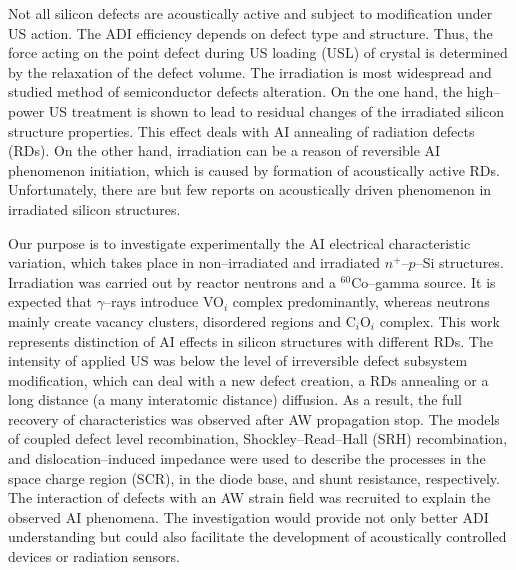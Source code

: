 \documentclass[aip,jap, amsmath,amssymb,reprint]{revtex4-1}
\begin{document}
Not all silicon defects are acoustically active and subject to modification under US action.
The ADI efficiency depends on defect type and structure. \cite{UST:Medvid}
Thus, the force acting on the point defect during US loading (USL) of crystal is determined by the relaxation of the defect volume\cite{MirzadeJAP2011,PeleshchakUJF2016}.
The irradiation is most widespread and studied method of semiconductor defects alteration.
On the one hand, the high--power US treatment is shown\cite{YOlikh2007TPL,Parchinskii2006,Gorb2010,Podolian2012} to lead to residual changes of the irradiated silicon structure properties.
This effect deals with AI annealing of radiation defects (RDs).
On the other hand, irradiation can be a reason of reversible AI phenomenon initiation, \cite{YOlikh2006TPL,YOlikhTPL2011} which is caused by formation of acoustically active RDs.
Unfortunately, there are but few reports on acoustically driven phenomenon in irradiated silicon structures.


Our purpose is to investigate experimentally the AI electrical characteristic variation, which takes place in non--irradiated and irradiated $n^+$--$p$--Si structures.
Irradiation was carried out by reactor neutrons and a $^{60}$Co--gamma source.
It is expected that $\gamma$--rays introduce
VO$_i$ complex predominantly,\cite{NIEL:Jafari,Gamma:Prabhakara,NIEL:Moll}
whereas neutrons mainly create vacancy clusters, \cite{Rew:Srour,Pintilie} disordered regions \cite{Neutron:Arutyunov} and C$_i$O$_i$ complex.  \cite{NIEL:Moll,neutron:Londos}
This work represents distinction of AI effects in silicon structures with different RDs.
The intensity of applied US was below the level of irreversible defect subsystem modification,
which can deal with a new defect creation, a RDs annealing or a long distance (a many interatomic distance) diffusion.
As a result, the full recovery of characteristics was observed after AW propagation stop.
The models of coupled defect level recombination, \cite{CDLR:JAP1995,CDLR:JAP} Shockley--Read--Hall (SRH) recombination, and dislocation--induced impedance \cite{Rsh:Gopal2003,Rsh:Gopal2004} were used to describe the processes in the space charge region (SCR),  in the diode base, and shunt resistance, respectively.
The interaction of defects with an AW strain field \cite{MirzadeJAP2011,PeleshchakUJF2016} was recruited to explain the observed AI phenomena.
The investigation would provide not only better ADI understanding but could also facilitate the development of acoustically controlled devices or radiation sensors.
\end{document}
